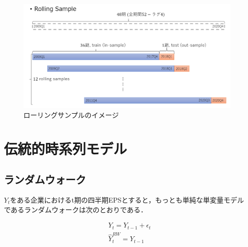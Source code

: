 \documentclass[a4paper，12pt]{jsarticle}
\begin{document}
\begin{figure}
  \centering
  \caption{ローリングサンプルのイメージ}
  \label{fig:rolling}
  \includegraphics[width=12cm]{./img/_rolling_sample.png}
\end{figure}

\section{伝統的時系列モデル}

\subsection{ランダムウォーク}

$Y_t$をある企業におけるt期の四半期EPSとすると，もっとも単純な単変量モデルであるランダムウォークは次のとおりである．

\begin{equation}
  \begin{split}
    & Y_t = Y_{t-1} + \epsilon_t \\
    & \hat{Y}_t^{RW} = Y_{t-1} \\
  \end{split}
\end{equation}        

\end{document}
